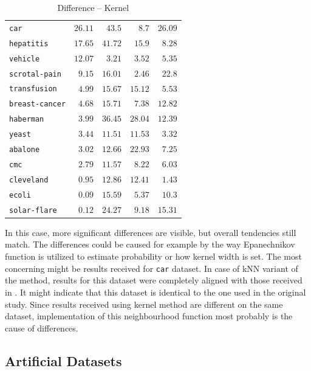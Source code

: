\documentclass[12pt]{article}
\begin{document}
\begin{table}[H]
\begin{minipage}[t]{0.5\textwidth}
\begin{tabular}{lrrrr}
    \texttt{car} & $26.11$ & $43.5$ & $8.7$ & $26.09$ \\
    \texttt{hepatitis} & $17.65$ & $41.72$ & $15.9$ & $8.28$ \\
    \texttt{vehicle} & $12.07$ & $3.21$ & $3.52$ & $5.35$ \\
    \texttt{scrotal-pain} & $9.15$ & $16.01$ & $2.46$ & $22.8$ \\
    \texttt{transfusion} & $4.99$ & $15.67$ & $15.12$ & $5.53$ \\
    \texttt{breast-cancer} & $4.68$ & $15.71$ & $7.38$ & $12.82$ \\
    \texttt{haberman} & $3.99$ & $36.45$ & $28.04$ & $12.39$ \\
    \texttt{yeast} & $3.44$ & $11.51$ & $11.53$ & $3.32$ \\
    \texttt{abalone} & $3.02$ & $12.66$ & $22.93$ & $7.25$ \\
    \texttt{cmc} & $2.79$ & $11.57$ & $8.22$ & $6.03$ \\
    \texttt{cleveland} & $0.95$ & $12.86$ & $12.41$ & $1.43$ \\
    \texttt{ecoli} & $0.09$ & $15.59$ & $5.37$ & $10.3$ \\
    \texttt{solar-flare} & $0.12$ & $24.27$ & $9.18$ & $15.31$ \\
    \bottomrule
\end{tabular}
\caption{Difference -- Kernel}
\label{tab:kernel_diff}
\end{minipage}
\end{table}

In this case, more significant differences are visible, but overall tendencies still match. The differences could be caused for example by the way Epanechnikov function is utilized to estimate probability or how kernel width is set. The most concerning might be results received for \texttt{car} dataset. In case of kNN variant of the method, results for this dataset were completely aligned with those received in \cite{Napierala2016}. It might indicate that this dataset is identical to the one used in the original study. Since results received using kernel method are different on the same dataset, implementation of this neighbourhood function most probably is the cause of differences.



\subsection{Artificial Datasets}
\end{document}

